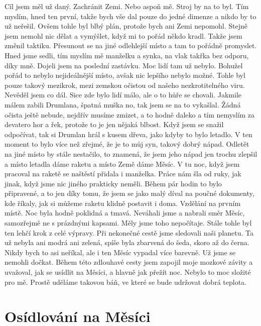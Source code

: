 Cíl jsem měl už daný. Zachránit Zemi. Nebo aspoň mě. Stroj by na to byl. Tím myslím, hned ten první, takže bych vše dal pouze do jedné dimenze a nikdo by to už neřešil. Ovšem tohle byl blbý plán, protože bych ani Zemi nepomohl. Stejně jsem nemohl nic dělat a vymýšlet, když mi to pořád někdo kradl. Takže jsem změnil taktiku. Přesunout se na jiné odlehlejší místo a tam to pořádně promyslet. Hned jsme sedli, tím myslím mě manželku a synka, na vlak takřka bez odporu, díky mně. Dojeli jsem na poslední zastávku. Moc lidí tam už nebylo. Bohužel pořád to nebylo nejideálnější místo, avšak nic lepšího nebylo možné. Tohle byl pouze takový mezikrok, mezi zemskou očistou od našeho nezkrotitelného viru. Nevěděl jsem co dál. Sice zde bylo lidí málo, ale o to hůře se chovali. Jakmile málem zabili Drumlana, špatná muška no, tak jsem se na to vykašlal. Žádná očista ještě nebude, nejdřív musíme zmizet, a to hodně daleko a tím nemyslím za devatero hor a řek, protože to je jen nějaká blbost. Když jsem se snažil odpočívat, tak si Drumlan hrál s kusem dřeva, jako kdyby to bylo letadlo. V ten moment to bylo více než zřejmé, že je to můj syn, takový dobrý nápad. Odletět na jiné místo by stále nestačilo, to znamená, že jsem jeho nápad jen trochu zlepšil a místo letadla dáme raketu a místo Země dáme Měsíc. V tu noc, když jsem pracoval na raketě se naštěstí přidala i manželka. Práce nám šla od ruky, jak jinak, když jsme nic jiného prakticky neměli. Během pár hodin to bylo připravené, a to jen díky tomu, že jsem se jako malý díval na poučné dokumenty, kde říkaly, jak si můžeme raketu klidně postavit i doma. Vzdělání na prvním místě. Noc byla hodně poklidná a tmavá. Neváhali jsme a nabrali směr Měsíc, samozřejmě ne s prázdnými kapsami. Měly jsme toho nepočítaje. Stále tohle byl ten lehčí krok z celé výpravy. Při nekonečné cestě jsme sledovali naši planetu. Ta už nebyla ani modrá ani zelená, spíše byla zbarvená do šeda, skoro až do černa. Nikdy bych to asi neříkal, ale i ten Měsíc vypadal více barevně. Už jsme se nemohli dočkat. Během této zdlouhavé cesty jsem zapojil moje mozkové závity a uvažoval, jak se usídlit na Měsíci, a hlavně jak přežít noc. Nebylo to moc složité pro mě. Prostě uděláme takovou báň, ve které se bude udržovat dobrá teplota.

\section{Osídlování na Měsíci}

